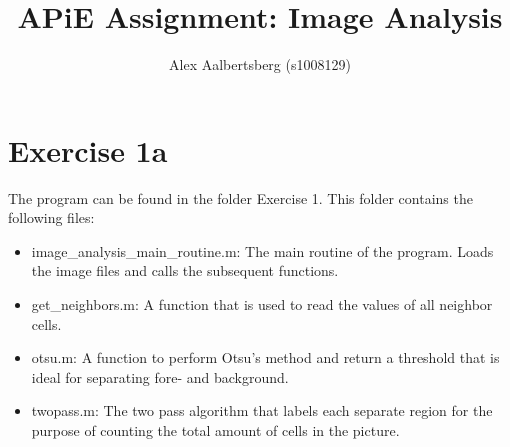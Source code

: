 \documentclass[12pt, a4paper]{article}
\begin{document}
	\author{Alex Aalbertsberg (s1008129)}	
	\title{APiE Assignment: Image Analysis}
	\maketitle
	\newpage
	\part*{Exercise 1a}
	The program can be found in the folder Exercise 1. This folder contains the following files:
	\begin{itemize}
		\item image\_analysis\_main\_routine.m: The main routine of the program. Loads the image files and calls the subsequent functions.
		\item get\_neighbors.m: A function that is used to read the values of all neighbor cells.
		\item otsu.m: A function to perform Otsu's method and return a threshold that is ideal for separating fore- and background.
		\item twopass.m: The two pass algorithm that labels each separate region for the purpose of counting the total amount of cells in the picture.
	\end{itemize}
	\newpage
\end{document}
